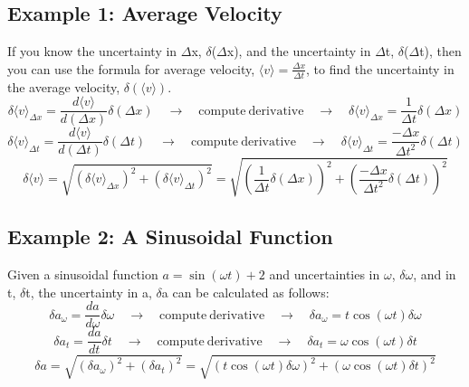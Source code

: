 \subsection*{Example 1: Average Velocity}
If you know the uncertainty in $\Delta$x, $\delta$($\Delta$x), and the uncertainty in $\Delta$t, $\delta$($\Delta$t), then you can use the formula for average velocity, $\langle v \rangle = \frac{\Delta x}{\Delta t}$, to find the uncertainty in the average velocity, $ \delta (\langle v \rangle)$.
\[ \delta \langle v \rangle_{\Delta x} = \frac{d \langle v \rangle}{d(\Delta x)} \delta (\Delta x)
   \quad \rightarrow \quad \mathrm{compute \ derivative} \quad \rightarrow \quad
   \delta \langle v \rangle_{\Delta x} = \frac{1}{\Delta t} \delta (\Delta x)\]
%
\[ \delta \langle v \rangle_{\Delta t} = \frac{d \langle v \rangle}{d(\Delta t)} \delta (\Delta t)
   \quad \rightarrow \quad \mathrm{compute \ derivative} \quad \rightarrow \quad
   \delta \langle v \rangle_{\Delta t} = \frac{-\Delta x}{\Delta t^{2}} \delta (\Delta t)\]
%
\[ \delta \langle v \rangle = \sqrt{(\delta \langle v \rangle_{\Delta x})^{2} 
   + (\delta \langle v \rangle_{\Delta t})^{2}} = \sqrt{\left(\frac{1}{\Delta t} \delta (\Delta x)\right)^{2} + \left(\frac{-\Delta x}{\Delta t^{2}} \delta (\Delta t)\right)^{2}} \]

\subsection*{Example 2: A Sinusoidal Function}
Given a sinusoidal function $a = \sin(\omega t) + 2$ and uncertainties in $\omega$, $\delta \omega$, and in t, $\delta$t, the uncertainty in a, $\delta$a can be calculated as follows:
 \[ \delta a_{\omega} = \frac{da}{d \omega} \delta \omega
   \quad \rightarrow \quad \mathrm{compute \ derivative} \quad \rightarrow \quad
   \delta a_{\omega} = t \cos(\omega t) \delta \omega \]
%
\[ \delta a_{t} = \frac{da}{dt} \delta t
   \quad \rightarrow \quad \mathrm{compute \ derivative} \quad \rightarrow \quad
   \delta a_{t} = \omega \cos(\omega t) \delta t \]
%
\[ \delta a = \sqrt{(\delta a_{\omega})^{2} + (\delta a_{t})^{2}} 
   = \sqrt{\left( t \cos(\omega t) \delta \omega \right)^{2} + \left( \omega \cos(\omega t) \delta t \right)^{2}} \]
   

